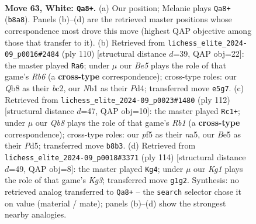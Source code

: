 \documentclass[11pt]{article}
\begin{document}
\clearpage

\begin{figure}[p]\centering
\begin{subfigure}{0.46\textwidth}\centering
\resizebox{\linewidth}{!}{%
\newchessgame
\chessboard[
  setfen={1Q6/8/k7/p2pBp2/P6r/8/8/RN4K1 w - - 6 63},
  showmover=false,
  pgfstyle=straightmove, color=movearrow, markmove={b8-a8}
]}
\caption{}
\end{subfigure}\hfill
\begin{subfigure}{0.46\textwidth}\centering
\resizebox{\linewidth}{!}{%
\newchessgame
\chessboard[
  setfen={8/5k2/1R1B1p2/3p4/p2P4/P6r/2b5/4K3 w - - 6 56},
  showmover=false,
  pgfstyle=straightmove, color=movearrow, markmove={b6-a6}
]}
\caption{}
\end{subfigure}
\\[4pt]
\begin{subfigure}{0.46\textwidth}\centering
\resizebox{\linewidth}{!}{%
\newchessgame
\chessboard[
  setfen={8/8/3p2B1/n2P3P/8/p1k5/7r/KR6 w - - 6 57},
  showmover=false,
  pgfstyle=straightmove, color=movearrow, markmove={b1-c1}
]}
\caption{}
\end{subfigure}\hfill
\begin{subfigure}{0.46\textwidth}\centering
\resizebox{\linewidth}{!}{%
\newchessgame
\chessboard[
  setfen={8/5p2/8/2k2B2/2p2P2/2P1R1K1/8/2r5 w - - 5 58},
  showmover=false,
  pgfstyle=straightmove, color=movearrow, markmove={g3-g4}
]}
\caption{}
\end{subfigure}
\caption{\textbf{Move 63, White: \texttt{Qa8+}.} (a) Our position; Melanie plays \texttt{Qa8+} (\texttt{b8a8}). Panels (b)--(d) are the retrieved master positions whose correspondence most drove this move (highest QAP objective among those that transfer to it). (b) Retrieved from \texttt{lichess\_elite\_2024-09\_p0016\#2484} (ply 110) [structural distance $d$=39, QAP obj=22]: the master played \texttt{Ra6}; under $\mu$ our \emph{Be5} plays the role of that game's \emph{Rb6} (a \textbf{cross-type} correspondence); cross-type roles: our \emph{Q}b8 as their \emph{b}c2, our \emph{N}b1 as their \emph{P}d4; transferred move \texttt{e5g7}. (c) Retrieved from \texttt{lichess\_elite\_2024-09\_p0023\#1480} (ply 112) [structural distance $d$=47, QAP obj=10]: the master played \texttt{Rc1+}; under $\mu$ our \emph{Qb8} plays the role of that game's \emph{Rb1} (a \textbf{cross-type} correspondence); cross-type roles: our \emph{p}f5 as their \emph{n}a5, our \emph{B}e5 as their \emph{P}d5; transferred move \texttt{b8b3}. (d) Retrieved from \texttt{lichess\_elite\_2024-09\_p0018\#3371} (ply 114) [structural distance $d$=49, QAP obj=8]: the master played \texttt{Kg4}; under $\mu$ our \emph{Kg1} plays the role of that game's \emph{Kg3}; transferred move \texttt{g1g2}. Synthesis: no retrieved analog transferred to \texttt{Qa8+} -- the \texttt{search} selector chose it on value (material / mate); panels (b)--(d) show the strongest nearby analogies.}
\label{fig:thought-m124}
\end{figure}
\end{document}
